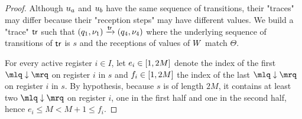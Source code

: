 \begin{proof}
	Although $u_a$ and $u_b$ have the same sequence of transitions, their "traces" may differ because their "reception steps" may have different values.
	We build a "trace" $\mathsf{tr}$ such that $(q_1,\nu_1) \xrightarrow{\mathsf{tr}} (q_4, \nu_4)$ where the underlying sequence of transitions of $\mathsf{tr}$ is $s$ and the receptions of values of $W$ match $\Theta$.
	
	For every active register $i \in I$, let $e_i \in [1,2M]$ denote the index of the first $\quotemarks{\enregact}$ on register $i$ in $s$ and $f_i \in [1,2M]$ the index of the last $\quotemarks{\enregact}$ on register $i$ in $s$. By hypothesis, because $s$ is of length $2M$, it contains at least two $\quotemarks{\enregact}$ on register $i$, one in the first half and one in the second half, hence $e_i \leq M < M +1 \leq f_i$. 
	

\end{proof}
